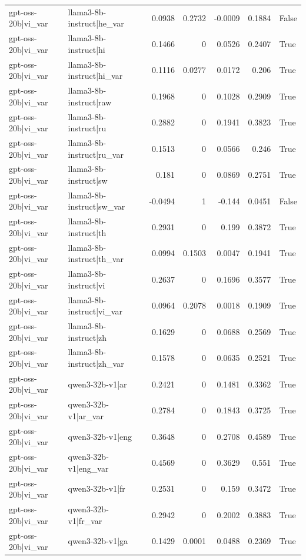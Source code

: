 \begin{table}
\begin{tabular}{l l r r r r l}
gpt-oss-20b|vi_var & llama3-8b-instruct|he_var & 0.0938 & 0.2732 & -0.0009 & 0.1884 & False \\
gpt-oss-20b|vi_var & llama3-8b-instruct|hi & 0.1466 & 0 & 0.0526 & 0.2407 & True \\
gpt-oss-20b|vi_var & llama3-8b-instruct|hi_var & 0.1116 & 0.0277 & 0.0172 & 0.206 & True \\
gpt-oss-20b|vi_var & llama3-8b-instruct|raw & 0.1968 & 0 & 0.1028 & 0.2909 & True \\
gpt-oss-20b|vi_var & llama3-8b-instruct|ru & 0.2882 & 0 & 0.1941 & 0.3823 & True \\
gpt-oss-20b|vi_var & llama3-8b-instruct|ru_var & 0.1513 & 0 & 0.0566 & 0.246 & True \\
gpt-oss-20b|vi_var & llama3-8b-instruct|sw & 0.181 & 0 & 0.0869 & 0.2751 & True \\
gpt-oss-20b|vi_var & llama3-8b-instruct|sw_var & -0.0494 & 1 & -0.144 & 0.0451 & False \\
gpt-oss-20b|vi_var & llama3-8b-instruct|th & 0.2931 & 0 & 0.199 & 0.3872 & True \\
gpt-oss-20b|vi_var & llama3-8b-instruct|th_var & 0.0994 & 0.1503 & 0.0047 & 0.1941 & True \\
gpt-oss-20b|vi_var & llama3-8b-instruct|vi & 0.2637 & 0 & 0.1696 & 0.3577 & True \\
gpt-oss-20b|vi_var & llama3-8b-instruct|vi_var & 0.0964 & 0.2078 & 0.0018 & 0.1909 & True \\
gpt-oss-20b|vi_var & llama3-8b-instruct|zh & 0.1629 & 0 & 0.0688 & 0.2569 & True \\
gpt-oss-20b|vi_var & llama3-8b-instruct|zh_var & 0.1578 & 0 & 0.0635 & 0.2521 & True \\
gpt-oss-20b|vi_var & qwen3-32b-v1|ar & 0.2421 & 0 & 0.1481 & 0.3362 & True \\
gpt-oss-20b|vi_var & qwen3-32b-v1|ar_var & 0.2784 & 0 & 0.1843 & 0.3725 & True \\
gpt-oss-20b|vi_var & qwen3-32b-v1|eng & 0.3648 & 0 & 0.2708 & 0.4589 & True \\
gpt-oss-20b|vi_var & qwen3-32b-v1|eng_var & 0.4569 & 0 & 0.3629 & 0.551 & True \\
gpt-oss-20b|vi_var & qwen3-32b-v1|fr & 0.2531 & 0 & 0.159 & 0.3472 & True \\
gpt-oss-20b|vi_var & qwen3-32b-v1|fr_var & 0.2942 & 0 & 0.2002 & 0.3883 & True \\
gpt-oss-20b|vi_var & qwen3-32b-v1|ga & 0.1429 & 0.0001 & 0.0488 & 0.2369 & True \\

\end{tabular}
\end{table}
